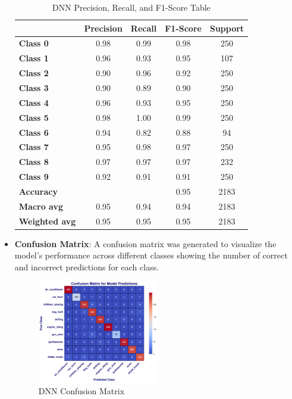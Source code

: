 \documentclass[conference]{IEEEtran}
\begin{document}
\begin{itemize}
\begin{table}[htbp]
\centering
\begin{tabular}{lcccc}
\toprule
 & \textbf{Precision} & \textbf{Recall} & \textbf{F1-Score} & \textbf{Support} \\
\midrule
\textbf{Class 0} & 0.98 & 0.99 & 0.98 & 250 \\
\textbf{Class 1} & 0.96 & 0.93 & 0.95 & 107 \\
\textbf{Class 2} & 0.90 & 0.96 & 0.92 & 250 \\
\textbf{Class 3} & 0.90 & 0.89 & 0.90 & 250 \\
\textbf{Class 4} & 0.96 & 0.93 & 0.95 & 250 \\
\textbf{Class 5} & 0.98 & 1.00 & 0.99 & 250 \\
\textbf{Class 6} & 0.94 & 0.82 & 0.88 & 94 \\
\textbf{Class 7} & 0.95 & 0.98 & 0.97 & 250 \\
\textbf{Class 8} & 0.97 & 0.97 & 0.97 & 232 \\
\textbf{Class 9} & 0.92 & 0.91 & 0.91 & 250 \\
\midrule
\textbf{Accuracy} &  &  & 0.95 & 2183 \\
\textbf{Macro avg} & 0.95 & 0.94 & 0.94 & 2183 \\
\textbf{Weighted avg} & 0.95 & 0.95 & 0.95 & 2183 \\
\bottomrule
\end{tabular}
\caption{DNN Precision, Recall, and F1-Score Table }
\label{tab:classification_report}
\end{table}
    \item \textbf{Confusion Matrix}: A confusion matrix was generated to visualize the model's performance across different classes showing the number of correct and incorrect predictions for each class.
\begin{figure}[htbp]
\centerline{\includegraphics[width=0.5\textwidth]{Images/DNNconfusion.png}}
\caption{DNN Confusion Matrix}
\label{fig:DNNconfusion}
\end{figure}
\end{itemize}
\end{document}
